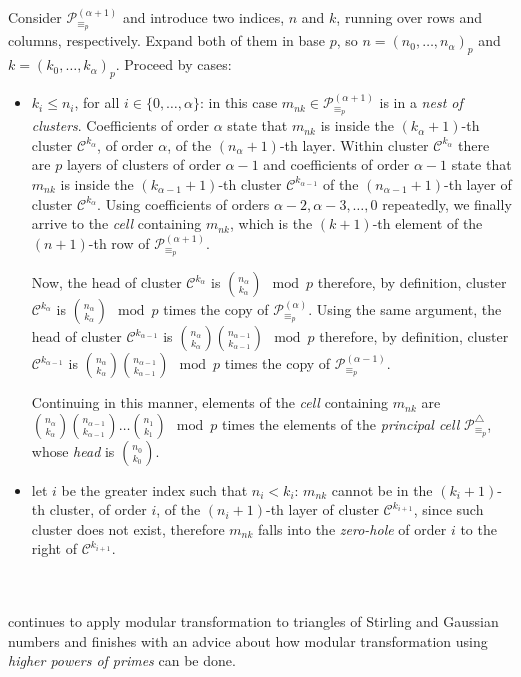 Consider $\mathcal{P}_{\equiv_{p}}^{(\alpha+1)}$ and introduce 
two indices, $n$ and $k$, running over rows and columns, respectively.
Expand both of them in base $p$, so $n=(n_{0},\ldots,n_{\alpha})_{p}$ and 
$k=(k_{0},\ldots,k_{\alpha})_{p}$. Proceed by cases:
\begin{itemize}

    \item $k_{i}\leq n_{i}$, for all $i\in\lbrace0,\ldots,\alpha\rbrace$: in
    this case $m_{nk}\in\mathcal{P}_{\equiv_{p}}^{(\alpha+1)}$ is in a
    \emph{nest of clusters}.  Coefficients of order $\alpha$ state that
    $m_{nk}$ is inside the $(k_{\alpha}+1)$-th cluster
    $\mathcal{C}^{k_{\alpha}}$, of order $\alpha$, of the $(n_{\alpha}+1)$-th
    layer.  Within cluster $\mathcal{C}^{k_{\alpha}}$ there are $p$ layers of
    clusters of order $\alpha-1$ and coefficients of order $\alpha-1$ state
    that $m_{nk}$ is inside the $(k_{\alpha-1}+1)$-th cluster
    $\mathcal{C}^{k_{\alpha-1}}$ of the $(n_{\alpha-1}+1)$-th layer of cluster
    $\mathcal{C}^{k_{\alpha}}$. Using coefficients of orders
    $\alpha-2,\alpha-3,\ldots,0$ repeatedly, we finally arrive to the
    \emph{cell} containing $m_{nk}$, which is the $(k+1)$-th element of the
    $(n+1)$-th row of $\mathcal{P}_{\equiv_{p}}^{(\alpha+1)}$.

    Now, the head of cluster $\mathcal{C}^{k_{\alpha}}$ is
    ${{n_{\alpha}}\choose{k_{\alpha}}}\mod p$ therefore, by definition, cluster
    $\mathcal{C}^{k_{\alpha}}$ is ${{n_{\alpha}}\choose{k_{\alpha}}}\mod p$
    times the copy of $\mathcal{P}_{\equiv_{p}}^{(\alpha)}$.  Using the same
    argument, the head of cluster $\mathcal{C}^{k_{\alpha-1}}$ is
    ${{n_{\alpha}}\choose{k_{\alpha}}}{{n_{\alpha-1}}\choose{k_{\alpha-1}}}\mod
    p$ therefore, by definition, cluster $\mathcal{C}^{k_{\alpha-1}}$ is
    ${{n_{\alpha}}\choose{k_{\alpha}}}{{n_{\alpha-1}}\choose{k_{\alpha-1}}}\mod
    p$ times the copy of $\mathcal{P}_{\equiv_{p}}^{(\alpha-1)}$.

    Continuing in this manner, elements of the \emph{cell} containing $m_{nk}$
    are ${{n_{\alpha}}\choose{k_{\alpha}}}{{n_{\alpha-1}}\choose
    {k_{\alpha-1}}}\ldots{{n_{1}}\choose{k_{1}}}\mod p$ times the elements of 
    the \emph{principal cell} $\mathcal{P}_{\equiv_{p}}^{\bigtriangleup}$, whose
    \emph{head} is ${{n_{0}}\choose{k_{0}}}$. 

    \item let $i$ be the greater index such that $n_{i}<k_{i}$: $m_{nk}$ cannot
    be in the $(k_{i}+1)$-th cluster, of order $i$, of the $(n_{i}+1)$-th layer
    of cluster $\mathcal{C}^{k_{i+1}}$, since such cluster does not exist,
    therefore $m_{nk}$ falls into the \emph{zero-hole} of order $i$ to the
    right of $\mathcal{C}^{k_{i+1}}$.

\end{itemize}
\quad
\\\\
\citeauthor{sved:1988} continues to apply modular transformation to triangles
of Stirling and Gaussian numbers and finishes with an advice about how modular
transformation using \emph{higher powers of primes} can be done.

